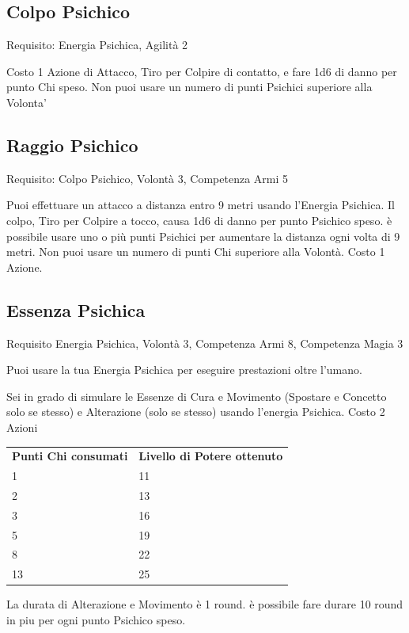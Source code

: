 \documentclass[a4paper,11pt,twoside,openany]{book}
\begin{document}
\subsection{Colpo Psichico}

Requisito: Energia Psichica, Agilità 2

Costo 1 Azione di Attacco, Tiro per Colpire di contatto, e fare 1d6 di danno per punto Chi speso. Non puoi usare un numero di punti Psichici superiore alla Volonta'

\subsection{Raggio Psichico}

Requisito: Colpo Psichico, Volontà 3, Competenza Armi 5

Puoi effettuare un attacco a distanza entro 9 metri usando l'Energia Psichica.
Il colpo, Tiro per Colpire a tocco, causa 1d6 di danno per punto Psichico speso. è possibile usare uno o più punti Psichici per aumentare la distanza ogni volta di 9 metri.
Non puoi usare un numero di punti Chi superiore alla Volontà. Costo 1 Azione.

\subsection{Essenza Psichica}

Requisito Energia Psichica, Volontà 3, Competenza Armi 8, Competenza Magia 3

Puoi usare la tua Energia Psichica per eseguire prestazioni oltre l'umano.

Sei in grado di simulare le Essenze di Cura e Movimento (Spostare e Concetto solo se stesso) e Alterazione (solo se stesso) usando l'energia Psichica. Costo 2 Azioni

\bigskip

\begin{tabular}{ll}
\toprule
\textbf{Punti Chi consumati} & \textbf{Livello di Potere ottenuto}\tabularnewline
1 & 11\tabularnewline
2 & 13\tabularnewline
3 & 16\tabularnewline
5 & 19\tabularnewline
8 & 22\tabularnewline
13 & 25\tabularnewline

\end{tabular}

\bigskip

La durata di Alterazione e Movimento è 1 round. è possibile fare durare 10 round in piu per ogni punto Psichico speso.
\end{document}
